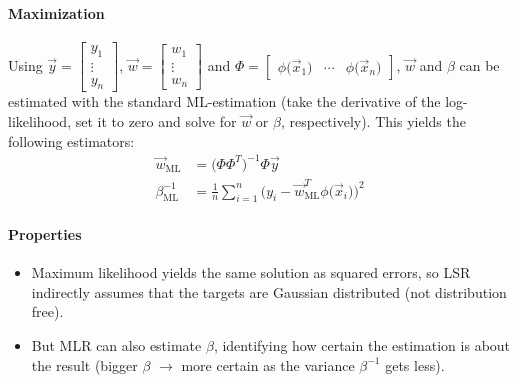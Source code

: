 			\paragraph{Maximization}
				Using \( \vec{y} = \begin{bmatrix} y_1 \\ \vdots \\ y_n \end{bmatrix} \), \( \vec{w} = \begin{bmatrix} w_1 \\ \vdots \\ w_n \end{bmatrix} \) and \( \Phi = \begin{bmatrix} \phi\big(\vec{x}_1\big) & \cdots & \phi\big(\vec{x}_n\big) \end{bmatrix} \), \(\vec{w}\) and \(\beta\) can be estimated with the standard ML-estimation (take the derivative of the log-likelihood, set it to zero and solve for \(\vec{w}\) or \(\beta\), respectively). This yields the following estimators:
				\begin{align*}
					\vec{w}_\textrm{ML}    & = \big(\Phi \Phi^T\big)^{-1} \Phi \vec{y}                                                      \\
					\beta_\textrm{ML}^{-1} & = \frac{1}{n} \sum_{i = 1}^{n} \Big(y_i - \vec{w}_\textrm{ML}^T \phi\big(\vec{x}_i\big)\Big)^2
				\end{align*}

			\paragraph{Properties}
				\begin{itemize}
					\item Maximum likelihood yields the same solution as squared errors, so LSR indirectly assumes that the targets are Gaussian distributed (not distribution free).
					\item But MLR can also estimate \(\beta\), identifying how certain the estimation is about the result (bigger \(\beta\) \(\to\) more certain as the variance \(\beta^{-1}\) gets less).
				\end{itemize}

